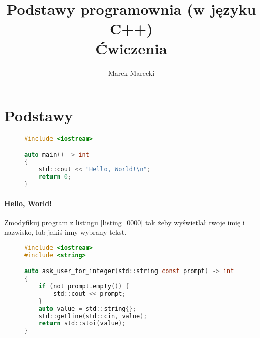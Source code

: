 \documentclass[11pt,a4paper,titlepage,onecolumn]{article}
\author{Marek Marecki}
\title{Podstawy programownia (w języku C++)\\{\Large Ćwiczenia}}
\begin{document}
\maketitle

\tableofcontents
\lstlistoflistings

\newpage


\section{Podstawy}

\begin{figure}
\begin{lstlisting}[caption={Hello, World!},
    captionpos=b,
    label=listing_0000,
    language=c]
#include <iostream>

auto main() -> int
{
    std::cout << "Hello, World!\n";
    return 0;
}
\end{lstlisting}
\end{figure}

\paragraph{Hello, World!} Zmodyfikuj program z listingu
\ref{listing_0000} tak żeby wyświetlał twoje imię i nazwisko, lub
jakiś inny wybrany tekst.

\begin{figure}
\begin{lstlisting}[caption={Hello, World!},
    captionpos=b,
    label=listing_0001,
    language=c]
#include <iostream>
#include <string>

auto ask_user_for_integer(std::string const prompt) -> int
{
    if (not prompt.empty()) {
        std::cout << prompt;
    }
    auto value = std::string{};
    std::getline(std::cin, value);
    return std::stoi(value);
}
\end{lstlisting}
\end{figure}
\end{document}

